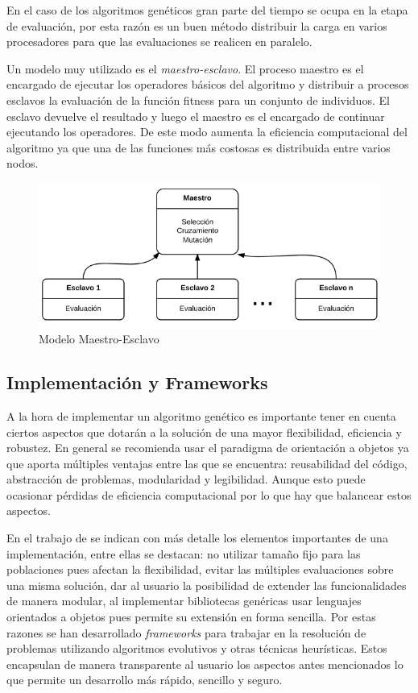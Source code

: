 En el caso de los algoritmos genéticos gran parte del tiempo se ocupa en la etapa de evaluación, por esta razón es un buen método distribuir la carga en varios procesadores para que las evaluaciones se realicen en paralelo. 

Un modelo muy utilizado es el \emph{maestro-esclavo}. El proceso maestro es el encargado de ejecutar los operadores básicos del algoritmo y distribuir a procesos esclavos la evaluación de la función fitness para un conjunto de individuos. El esclavo devuelve el resultado y luego el maestro es el encargado de continuar ejecutando los operadores. De este modo aumenta la eficiencia computacional del algoritmo ya que una de las funciones más costosas es distribuida entre varios nodos.

\begin{figure}[H]
	\centering
	\includegraphics[width=0.9\linewidth]{Figures/diagrama-master-slave}
	\caption[Modelo Maestro-Esclavo]{Modelo Maestro-Esclavo}
	\label{fig:diagrama-master-slave}
\end{figure}

\subsection{Implementación y Frameworks}

A la hora de implementar un algoritmo genético es importante tener en cuenta ciertos aspectos que dotarán a la solución de una mayor flexibilidad, eficiencia y robustez. En general se recomienda usar el paradigma de orientación a objetos ya que aporta múltiples ventajas entre las que se encuentra: reusabilidad del código, abstracción de problemas, modularidad y legibilidad. Aunque esto puede ocasionar pérdidas de eficiencia computacional por lo que hay que balancear estos aspectos.

En el trabajo de \citet{Alba1997} se indican con más detalle los elementos importantes de una implementación, entre ellas se destacan: no utilizar tamaño fijo para las poblaciones pues afectan la flexibilidad, evitar las múltiples evaluaciones sobre una misma solución, dar al usuario la posibilidad de extender las funcionalidades de manera modular, al implementar bibliotecas genéricas usar lenguajes orientados a objetos pues permite su extensión en forma sencilla. Por estas razones se han desarrollado \emph{frameworks} para trabajar en la resolución de problemas utilizando algoritmos evolutivos y otras técnicas heurísticas. Estos encapsulan de manera transparente al usuario los aspectos antes mencionados lo que permite un desarrollo más rápido, sencillo y seguro.

